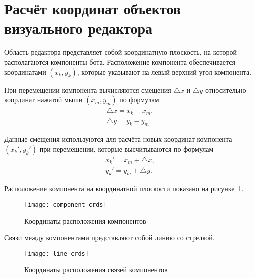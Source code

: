 


\section{Расчёт координат объектов визуального редактора}


Область редактора представляет собой координатную плоскость,
на которой располагаются компоненты бота.
Расположение компонента обеспечивается координатами $ ( x_k , y_k ) $,
которые указывают
на левый верхний угол компонента.

При перемещении компонента вычисляются смещения
$ \bigtriangleup x $ и $\bigtriangleup y$
относительно координат нажатой мыши
$ (x_m, y_m) $ по формулам
\begin{gather}
	\bigtriangleup x = x_k - x_m, \\
	\bigtriangleup y = y_k - y_m.
\end{gather}

Данные смещения используются для расчёта новых координат компонента
$ (x_k', y_k') $ при перемещении,
которые высчитываются по формулам
\begin{gather}
	x_k' = x_m + \bigtriangleup x, \\
	y_k' = y_m + \bigtriangleup y.
\end{gather}

Расположение компонента на координатной плоскости показано
на рисунке~\ref{f:component-crds}.

\begin{figure}[h]
	\centering
	\texttt{[image: component-crds]}
	\caption{Координаты расположения компонентов}
	\label{f:component-crds}
\end{figure}

Связи между компонентами представляют собой линию со стрелкой.


\begin{figure}[h]
	\centering
	\texttt{[image: line-crds]}
	\caption{Координаты расположения связей компонентов}
	\label{f:line-crds}
\end{figure}


